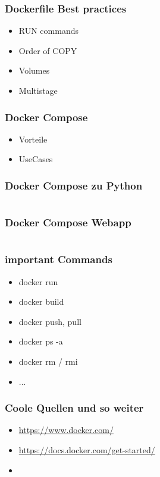 \documentclass[22pt,handout]{beamer}
\begin{document}
\begin{frame}[t]
    \frametitle{Dockerfile Best practices}
    \begin{itemize}
        \item RUN commands
        \item Order of COPY
        \item Volumes
        \item Multistage
    \end{itemize} 
\end{frame}

\begin{frame}[t]
    \frametitle{Docker Compose}
    \begin{itemize}
        \item Vorteile
        \item UseCases
    \end{itemize} 
\end{frame}

\begin{frame}[fragile]
    \frametitle{Docker Compose zu Python}
    \inputminted[fontsize=\footnotesize, frame=lines]{dockerfile}{../examples/Dockerfile.cmd}
\end{frame}

\begin{frame}[fragile]
    \frametitle{Docker Compose Webapp}
    \inputminted[fontsize=\footnotesize, frame=lines]{dockerfile}{../examples/Dockerfile.cmd}
\end{frame}

\begin{frame}[t]
    \frametitle{important Commands}
    \begin{itemize}
        \item docker run
        \item docker build
        \item docker push, pull
        \item docker ps -a
        \item docker rm / rmi
        \item ...
    \end{itemize} 
\end{frame}

\begin{frame}[t]
    \frametitle{Coole Quellen und so weiter}
    \begin{itemize}
        \item \href{https://www.docker.com/}{https://www.docker.com/}
        \item \href{https://docs.docker.com/get-started/}{https://docs.docker.com/get-started/}
        \item 
    \end{itemize} 
\end{frame}
\end{document}
